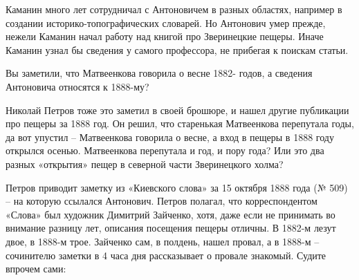 Каманин много лет сотрудничал с Антоновичем в разных областях, например в создании историко-топографи\-ческих словарей. Но Антонович умер прежде, нежели Каманин начал работу над книгой про Зверинецкие пещеры. Иначе Каманин узнал бы сведения у самого профессора, не прибегая к поискам статьи.

Вы заметили, что Матвеенкова говорила о весне 1882- годов, а сведения Антоновича относятся к 1888-му?

Николай Петров тоже это заметил в своей брошюре, и нашел другие публикации про пещеры за 1888 год. Он решил, что старенькая Матвеенкова перепутала годы, да вот упустил – Матвеенкова говорила о весне, а вход в пещеры в 1888 году открылся осенью. Матвеенкова перепутала и год, и пору года? Или это два разных «открытия» пещер в северной части Зверинецкого холма?

Петров приводит заметку из «Киевского слова» за 15 октября 1888 года (№ 509) – на которую ссылался Антонович. Петров полагал, что корреспондентом «Слова» был художник Димитрий Зайченко, хотя, даже если не принимать во внимание разницу лет, описания посещения пещеры отличны. В 1882-м лезут двое, в 1888-м трое. Зайченко сам, в полдень, нашел провал, а в 1888-м – сочинителю заметки в 4 часа дня рассказывает о провале знакомый. Судите впрочем сами:

